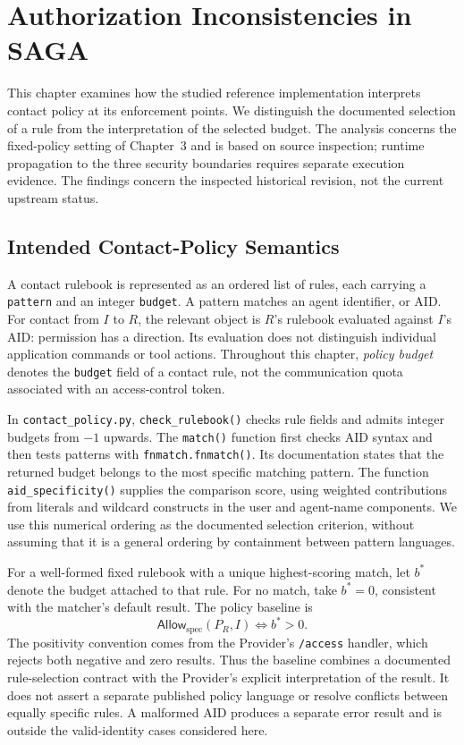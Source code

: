 \section{Authorization Inconsistencies in SAGA}

This chapter examines how the studied reference implementation interprets contact
policy at its enforcement points. We distinguish the documented selection of
a rule from the interpretation of the selected budget. The analysis concerns
the fixed-policy setting of Chapter~3 and is based on source inspection;
runtime propagation to the three security boundaries requires separate
execution evidence. The findings concern the inspected historical revision,
not the current upstream status.


\subsection{Intended Contact-Policy Semantics}

A contact rulebook is represented as an ordered list of rules, each carrying
a \texttt{pattern} and an integer \texttt{budget}. A pattern matches an agent
identifier, or AID. For contact from $I$ to $R$, the relevant object is $R$'s
rulebook evaluated against $I$'s AID: permission has a direction. Its evaluation
does not distinguish individual application commands or tool actions.
Throughout this chapter, \emph{policy budget} denotes the
\texttt{budget} field of a contact rule, not the communication quota associated
with an access-control token.

In \texttt{contact\_policy.py}, \texttt{check\_rulebook()} checks rule fields
and admits integer budgets from $-1$ upwards. The \texttt{match()} function
first checks AID syntax and then tests patterns with \texttt{fnmatch.fnmatch()}.
Its documentation states that the returned budget belongs to the most
specific matching pattern. The function \texttt{aid\_specificity()} supplies
the comparison score, using weighted contributions from literals and wildcard
constructs in the user and agent-name components. We use this numerical
ordering as the documented selection criterion, without assuming that it is
a general ordering by containment between pattern languages.

For a well-formed fixed rulebook with a unique highest-scoring match, let
$b^*$ denote the budget attached to that rule. For no match, take $b^*=0$,
consistent with the matcher's default result. The policy baseline is
\[
  \mathsf{Allow}_{\mathrm{spec}}(P_R,I)
  \Longleftrightarrow b^*>0.
\]
The positivity convention comes from the Provider's \texttt{/access} handler,
which rejects both negative and zero results. Thus the baseline combines a
documented rule-selection contract with the Provider's explicit interpretation
of the result. It does not assert a separate published policy language or
resolve conflicts between equally specific rules. A malformed AID produces a
separate error result and is outside the valid-identity cases considered here.

